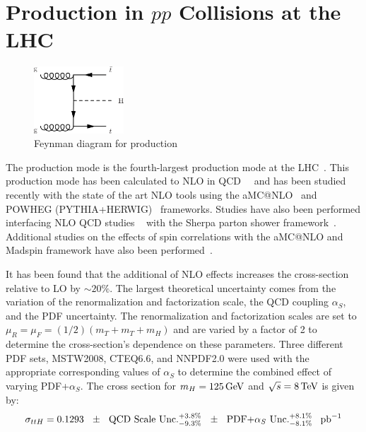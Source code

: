 \section{\ttH Production in $pp$ Collisions at the LHC}
\label{ttH_production_overview}

\begin{figure}[h]
   \centering
  \includegraphics[width=0.3\textwidth]{Figures/Feynman_Diagrams/higgs_production__ttH.pdf}
  \caption{Feynman diagram for \ttH production} \label{fd:ttH_simple}
\end{figure}

\par The \ttH production mode is the fourth-largest production mode at
the LHC~\cite{th:HiggsXS_2013}.  This production mode has been
calculated to NLO in
QCD~\cite{tthXS_NLO_BeenakkerEtAl_1}~\cite{tthXS_NLO_BeenakkerEtAl_2}
and has been studied recently with the state of the art NLO tools
using the aMC@NLO~\cite{tthXS_aMCatNLO_Frederix} and POWHEG
(PYTHIA+HERWIG)~\cite{tthXS_powheg_Garzelli} frameworks. Studies have
also been performed interfacing NLO QCD studies
~\cite{tthXS_NLO_Dawson} with the Sherpa parton shower
framework~\cite{tthXS_sherpa_Gleisberg}.  Additional studies on the
effects of spin correlations with the aMC@NLO and Madspin framework
have also been performed~\cite{tthXS_aMCatNLO_madspin_Artoisenet}.  

\par  It has been found that the additional of NLO effects increases
the cross-section relative to LO by $\sim20\%$.  The largest
theoretical uncertainty comes from the variation of the
renormalization and factorization scale, the QCD coupling $\alpha_{S}$,
and the PDF uncertainty.  The renormalization and factorization scales
are set to $\mu_{R} = \mu_{F} = (1/2)(m_{T} + m_{T} + m_{H})$ and are
varied by a factor of 2 to determine the cross-section's dependence on
these parameters.  Three different PDF sets,  MSTW2008, CTEQ6.6, and
NNPDF2.0 were used with the appropriate corresponding values of
$\alpha_{S}$ to determine the combined effect of varying
PDF+$\alpha_{S}$.  The cross section for $m_{H} = 125\,\text{Ge\hspace{-.08em}V}$ and
$\sqrt{s}=8\,\text{Te\hspace{-.08em}V}$ is given by:
\begin{equation}\label{eq:tth_xs}
\sigma_{ttH} = 0.1293~~\pm \text{~~QCD Scale Unc.}^{+3.8\%}_{-9.3\%}~~\pm
\text{~~PDF+$\alpha_{S}$ Unc.}^{+8.1\%}_{-8.1\%}~~\mbox{\ensuremath{\,\text{pb}^\text{$-$1}}}
\end{equation}

